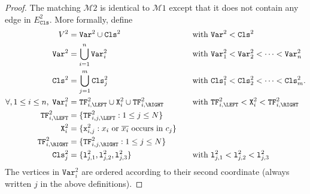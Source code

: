 \begin{proof}
    The matching $\mathcal{M}{2}$ is identical to $\mathcal{M}{1}$ except that it does not
    contain any edge in $E^{2}_{\texttt{Cls}}$.
    More formally,
    define
    \begin{alignat*} {2}
      V^{2} &= \texttt{Var}^{2} \cup \texttt{Cls}^{2}
      &\quad&\text{with $\texttt{Var}^{2} < \texttt{Cls}^{2}$}
      \\
      \texttt{Var}^{2} &= \bigcup_{i=1}^{n} \texttt{Var}^{2}_{i}
      &&\text{with $\texttt{Var}^{2}_1 < \texttt{Var}^{2}_2 < \dots < \texttt{Var}^{2}_n$}
      \\
      \texttt{Cls}^{2} &= \bigcup_{j=1}^{m} \texttt{Cls}^{2}_{j}
      &&\text{with $\texttt{Cls}^{2}_1 < \texttt{Cls}^{2}_2 < \dots < \texttt{Cls}^{2}_m$.}
      \\
      \forall, 1 \leq i \leq n,\;
      \texttt{Var}^{2}_{i} &= \texttt{TF}^{2}_{i,\LEFT} \cup \texttt{X}^{2}_{i} \cup \texttt{TF}^{2}_{i,\RIGHT}
      &&\text{with $\texttt{TF}^{2}_{i,\LEFT} < \texttt{X}^{2}_{i} < \texttt{TF}^{2}_{i,\RIGHT}$}
      \\
      \texttt{TF}^{2}_{i,\LEFT}
      &=
      \{\texttt{TF}^{2}_{i,j,\LEFT} : 1 \leq j \leq N\}
      &&\\
      \texttt{X}^{2}_{i}
      &=
      \{\texttt{x}^{2}_{i,j} : \text{$x_{i}$ or $\overline{x_{i}}$ occurs in $c_{j}$}\}
      &&\\
      \texttt{TF}^{2}_{i,\RIGHT}
      &=
      \{\texttt{TF}^{2}_{i,j,\RIGHT} : 1 \leq j \leq N\}
      &&
      \\
      \texttt{Cls}^{2}_{j}
      &=
      \{
      \texttt{l}^{2}_{j,1},
      \texttt{l}^{2}_{j,2},
      \texttt{l}^{2}_{j,3}
      \}
      &&\text{with $\texttt{l}^{2}_{j,1} < \texttt{l}^{2}_{j,2} < \texttt{l}^{2}_{j,3}$}
      \\
    \end{alignat*}
    The vertices in $\texttt{Var}^{2}_{i}$ are ordered according to their second coordinate
    (always written $j$ in the above definitions).


\end{proof}
